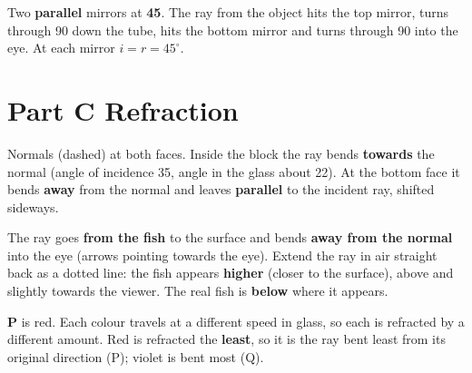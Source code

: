 \documentclass[11pt]{article}
\begin{document}
\begin{minipage}[t]{0.58\textwidth}
\vspace{0pt}
 Two \textbf{parallel} mirrors at \textbf{45\textdegree}. The ray from the object hits the top mirror, turns through 90\textdegree{} down the tube, hits the bottom mirror and turns through 90\textdegree{} into the eye. At each mirror $i = r = 45^\circ$.
\end{minipage}\hfill
\begin{minipage}[t]{0.38\textwidth}
\vspace{0pt}\centering{}
\end{minipage}

\section*{Part C \quad Refraction}
\begin{minipage}[t]{0.5\textwidth}
\vspace{0pt}
 Normals (dashed) at both faces. Inside the block the ray bends \textbf{towards} the normal (angle of incidence 35\textdegree, angle in the glass about 22\textdegree). At the bottom face it bends \textbf{away} from the normal and leaves \textbf{parallel} to the incident ray, shifted sideways.
\end{minipage}\hfill
\begin{minipage}[t]{0.46\textwidth}
\vspace{0pt}\centering{}
\end{minipage}

\begin{minipage}[t]{0.5\textwidth}
\vspace{0pt}
 The ray goes \textbf{from the fish} to the surface and bends \textbf{away from the normal} into the eye (arrows pointing towards the eye). Extend the ray in air straight back as a dotted line: the fish appears \textbf{higher} (closer to the surface), above and slightly towards the viewer. The real fish is \textbf{below} where it appears.
\end{minipage}\hfill
\begin{minipage}[t]{0.46\textwidth}
\vspace{0pt}\centering{}
\end{minipage}

 \textbf{P} is red. Each colour travels at a different speed in glass, so each is refracted by a different amount. Red is refracted the \textbf{least}, so it is the ray bent least from its original direction (P); violet is bent most (Q).
\end{document}
